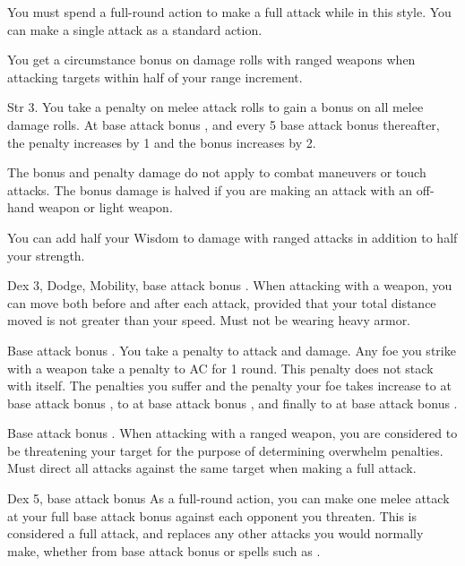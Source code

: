 You must spend a full-round action to make a full attack while in this style. You can make a single attack as a standard action.

 You get a  circumstance bonus on damage rolls with ranged weapons when attacking targets within half of your range increment. \babscalingdescription

 Str 3.
 You take a  penalty on melee attack rolls to gain a  bonus on all melee damage rolls. At base attack bonus , and every 5 base attack bonus thereafter, the penalty increases by 1 and the bonus increases by 2.
\par The bonus and penalty damage do not apply to combat maneuvers or touch attacks. The bonus damage is halved if you are making an attack with an off-hand weapon or light weapon.

 You can add half your Wisdom to damage with ranged attacks in addition to half your strength.

 Dex 3, Dodge, Mobility, base attack bonus .
 When attacking with a weapon, you can move both before and after each attack, provided that your total distance moved is not greater than your speed.
 Must not be wearing heavy armor.

\featpre Base attack bonus .
 You take a  penalty to attack and damage. Any foe you strike with a weapon take a  penalty to AC for 1 round. This penalty does not stack with itself. The penalties you suffer and the penalty your foe takes increase to  at base attack bonus , to  at base attack bonus , and finally to  at base attack bonus .

 Base attack bonus .
 When attacking with a ranged weapon, you are considered to be threatening your target for the purpose of determining overwhelm penalties.
 Must direct all attacks against the same target when making a full attack.

 Dex 5, base attack bonus 
 As a full-round action, you can make one melee attack at your full base attack bonus against each opponent you threaten. This is considered a full attack, and replaces any other attacks you would normally make, whether from base attack bonus or spells such as .


